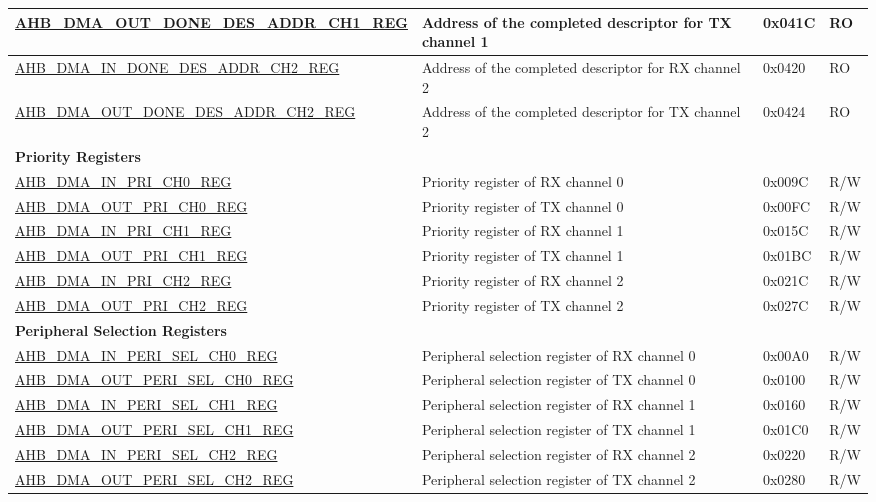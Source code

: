 \begin{longtable}{ | p{8cm} | p{8cm} | p{1.3cm} | p{1.5cm} | }
\hyperref[regdesc:AHBDMAOUTDONEDESADDRCHNREG]{AHB\_DMA\_OUT\_DONE\_DES\_ADDR\_CH1\_REG} & Address of the completed descriptor for TX channel 1 & 0x041C & RO \\ \hline
\hyperref[regdesc:AHBDMAINDONEDESADDRCHNREG]{AHB\_DMA\_IN\_DONE\_DES\_ADDR\_CH2\_REG} & Address of the completed descriptor for RX channel 2 & 0x0420 & RO \\ \hline
\hyperref[regdesc:AHBDMAOUTDONEDESADDRCHNREG]{AHB\_DMA\_OUT\_DONE\_DES\_ADDR\_CH2\_REG} & Address of the completed descriptor for TX channel 2 & 0x0424 & RO \\ \hline
\multicolumn{4}{|l|}{\textbf{Priority Registers}} \\ \hline
\hyperref[regdesc:AHBDMAINPRICHNREG]{AHB\_DMA\_IN\_PRI\_CH0\_REG} & Priority register of RX channel 0 & 0x009C & R/W \\ \hline
\hyperref[regdesc:AHBDMAOUTPRICHNREG]{AHB\_DMA\_OUT\_PRI\_CH0\_REG} & Priority register of TX channel 0 & 0x00FC & R/W \\ \hline
\hyperref[regdesc:AHBDMAINPRICHNREG]{AHB\_DMA\_IN\_PRI\_CH1\_REG} & Priority register of RX channel 1 & 0x015C & R/W \\ \hline
\hyperref[regdesc:AHBDMAOUTPRICHNREG]{AHB\_DMA\_OUT\_PRI\_CH1\_REG} & Priority register of TX channel 1 & 0x01BC & R/W \\ \hline
\hyperref[regdesc:AHBDMAINPRICHNREG]{AHB\_DMA\_IN\_PRI\_CH2\_REG} & Priority register of RX channel 2 & 0x021C & R/W \\ \hline
\hyperref[regdesc:AHBDMAOUTPRICHNREG]{AHB\_DMA\_OUT\_PRI\_CH2\_REG} & Priority register of TX channel 2 & 0x027C & R/W \\ \hline
\multicolumn{4}{|l|}{\textbf{Peripheral Selection Registers}} \\ \hline
\hyperref[regdesc:AHBDMAINPERISELCHNREG]{AHB\_DMA\_IN\_PERI\_SEL\_CH0\_REG} & Peripheral selection register of RX channel 0 & 0x00A0 & R/W \\ \hline
\hyperref[regdesc:AHBDMAOUTPERISELCHNREG]{AHB\_DMA\_OUT\_PERI\_SEL\_CH0\_REG} & Peripheral selection register of TX channel 0 & 0x0100 & R/W \\ \hline
\hyperref[regdesc:AHBDMAINPERISELCHNREG]{AHB\_DMA\_IN\_PERI\_SEL\_CH1\_REG} & Peripheral selection register of RX channel 1 & 0x0160 & R/W \\ \hline
\hyperref[regdesc:AHBDMAOUTPERISELCHNREG]{AHB\_DMA\_OUT\_PERI\_SEL\_CH1\_REG} & Peripheral selection register of TX channel 1 & 0x01C0 & R/W \\ \hline
\hyperref[regdesc:AHBDMAINPERISELCHNREG]{AHB\_DMA\_IN\_PERI\_SEL\_CH2\_REG} & Peripheral selection register of RX channel 2 & 0x0220 & R/W \\ \hline
\hyperref[regdesc:AHBDMAOUTPERISELCHNREG]{AHB\_DMA\_OUT\_PERI\_SEL\_CH2\_REG} & Peripheral selection register of TX channel 2 & 0x0280 & R/W \\ \hline
\end{longtable}
